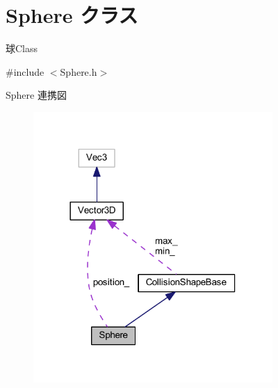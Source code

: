 \hypertarget{class_sphere}{}\section{Sphere クラス}
\label{class_sphere}


球\+Class  




{\ttfamily \#include $<$Sphere.\+h$>$}



Sphere 連携図\nopagebreak
\begin{figure}[H]
\begin{center}
\leavevmode
\includegraphics[width=258pt]{class_sphere__coll__graph}
\end{center}
\end{figure}
